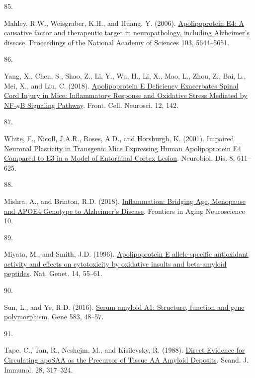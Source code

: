 \documentclass[
]{article}
\newlength{\cslhangindent}
\newlength{\csllabelwidth}
\newlength{\cslentryspacingunit} %
\newenvironment{CSLReferences}[2] %
 {%
  \setlength{\parindent}{0pt}
  \ifodd #1
  \let\oldpar\par
  \def\par{\hangindent=\cslhangindent\oldpar}
  \fi
  \setlength{\parskip}{#2\cslentryspacingunit}
 }%
 {}
\newcommand{\CSLLeftMargin}[1]{\parbox[t]{\csllabelwidth}{#1}}
\newcommand{\CSLRightInline}[1]{\parbox[t]{\linewidth - \csllabelwidth}{#1}\break}
\begin{document}
\begin{CSLReferences}{0}{0}
\leavevmode{}%
\CSLLeftMargin{85. }
\CSLRightInline{Mahley, R.W., Weisgraber, K.H., and Huang, Y. (2006). \href{https://doi.org/10.1073/pnas.0600549103}{Apolipoprotein {E4}: {A} causative factor and therapeutic target in neuropathology, including {Alzheimer}'s disease}. Proceedings of the National Academy of Sciences 103, 5644--5651.}

\leavevmode{}%
\CSLLeftMargin{86. }
\CSLRightInline{Yang, X., Chen, S., Shao, Z., Li, Y., Wu, H., Li, X., Mao, L., Zhou, Z., Bai, L., Mei, X., and Liu, C. (2018). \href{https://doi.org/10.3389/fncel.2018.00142}{Apolipoprotein {E Deficiency Exacerbates Spinal Cord Injury} in {Mice}: {Inflammatory Response} and {Oxidative Stress Mediated} by {NF-\(\kappa\)B Signaling Pathway}}. Front. Cell. Neurosci. 12, 142.}

\leavevmode{}%
\CSLLeftMargin{87. }
\CSLRightInline{White, F., Nicoll, J.A.R., Roses, A.D., and Horsburgh, K. (2001). \href{https://doi.org/10.1006/nbdi.2001.0401}{Impaired {Neuronal Plasticity} in {Transgenic Mice Expressing Human Apolipoprotein E4 Compared} to {E3} in a {Model} of {Entorhinal Cortex Lesion}}. Neurobiol. Dis. 8, 611--625.}

\leavevmode{}%
\CSLLeftMargin{88. }
\CSLRightInline{Mishra, A., and Brinton, R.D. (2018). \href{https://doi.org/10.3389/fnagi.2018.00312}{Inflammation: {Bridging Age}, {Menopause} and {APOE4 Genotype} to {Alzheimer}'s {Disease}}. Frontiers in Aging Neuroscience 10.}

\leavevmode{}%
\CSLLeftMargin{89. }
\CSLRightInline{Miyata, M., and Smith, J.D. (1996). \href{https://doi.org/10.1038/ng0996-55}{Apolipoprotein {E} allele-specific antioxidant activity and effects on cytotoxicity by oxidative insults and beta-amyloid peptides}. Nat. Genet. 14, 55--61.}

\leavevmode{}%
\CSLLeftMargin{90. }
\CSLRightInline{Sun, L., and Ye, R.D. (2016). \href{https://doi.org/10.1016/j.gene.2016.02.044}{Serum amyloid {A1}: {Structure}, function and gene polymorphism}. Gene 583, 48--57.}

\leavevmode{}%
\CSLLeftMargin{91. }
\CSLRightInline{Tape, C., Tan, R., Neshejm, M., and Kisilevsky, R. (1988). \href{https://doi.org/10.1111/j.1365-3083.1988.tb01455.x}{Direct {Evidence} for {Circulating apoSAA} as the {Precursor} of {Tissue AA Amyloid Deposits}}. Scand. J. Immunol. 28, 317--324.}


\end{CSLReferences}
\end{document}
